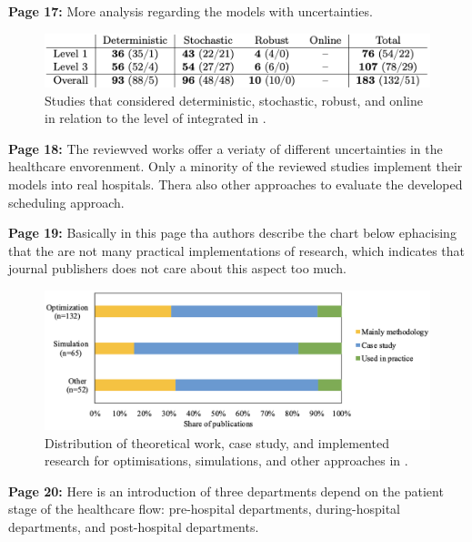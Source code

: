     \textbf{Page 17:}
    More analysis regarding the models with uncertainties.
    \begin{figure}[H]
        \centering
        \includegraphics[width=1\textwidth]{figures/0010_SR02NL23/fig7.png}
        \caption{Studies that considered deterministic, stochastic, robust, and online in relation to the level of integrated in \cite{x338}.}
        \label{fig7:0010_SR02NL23}
    \end{figure}

    \textbf{Page 18:}
    The reviewved works offer a veriaty of different uncertainties in the healthcare envorenment. Only a minority of the reviewed studies implement their models into real hospitals. Thera also other approaches to evaluate the developed scheduling approach.

    \textbf{Page 19:}
    Basically in this page tha authors describe the chart below ephacising that the are not many practical implementations of research, which indicates that journal publishers does not care about this aspect too much.
    \begin{figure}[H]
        \centering
        \includegraphics[width=1\textwidth]{figures/0010_SR02NL23/fig8.png}
        \caption{Distribution of theoretical work, case study, and implemented research for optimisations, simulations, and other approaches in \cite{x338}.}
        \label{fig8:0010_SR02NL23}
    \end{figure}
    
    \textbf{Page 20:}
    Here is an introduction of three departments depend on the patient stage of the healthcare flow: pre-hospital departments, during-hospital departments, and post-hospital departments.
    
